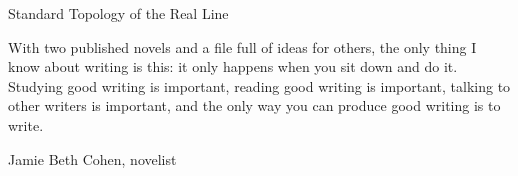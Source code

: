 \begin{section}{Standard Topology of the Real Line}
\begingroup
\setlength{\epigraphwidth}{0.4\textwidth}
\epigraph{With two published novels and a file full of ideas for others, the only thing I know about writing is this: it only happens when you sit down and do it. Studying good writing is important, reading good writing is important, talking to other writers is important, and the only way you can produce good writing is to write.}{Jamie Beth Cohen, novelist}
\endgroup

\end{section}